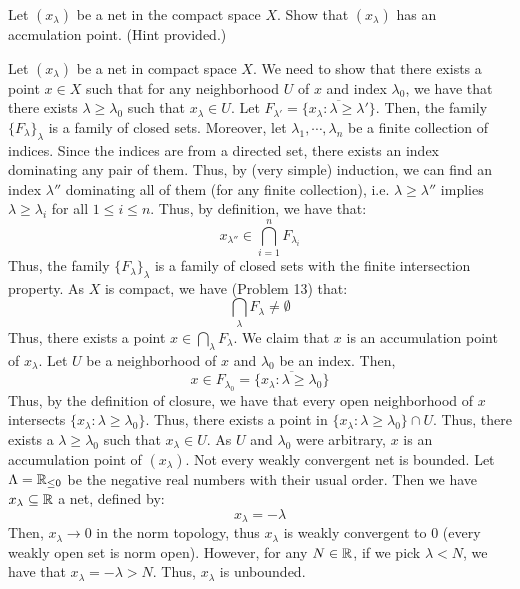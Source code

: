 \documentclass[12pt]{article}
\begin{document}
\begin{problem}{51}
    Let $(x_\lambda)$ be a net in the compact space $X$. Show that $(x_\lambda)$ has an accmulation point. (Hint provided.)
\end{problem}
\begin{solution}
    Let $(x_\lambda)$ be a net in compact space $X$. We need to show that there exists a point $x \in X$ such that for any neighborhood $U$ of $x$ and index $\lambda_0$, we have that there exists $\lambda \geq \lambda_0$ such that $x_{\lambda} \in U$. \bbni
    Let $F_{\lambda'} = \overline{\{x_\lambda: \lambda \geq \lambda'\}}$. Then, the family $\{F_\lambda\}_\lambda$ is a family of closed sets. Moreover, let $\lambda_1, \cdots, \lambda_n$ be a finite collection of indices. Since the indices are from a directed set, there exists an index dominating any pair of them. Thus, by (very simple) induction, we can find an index $\lambda''$ dominating all of them (for any finite collection), i.e. $\lambda \geq \lambda''$ implies $\lambda \geq \lambda_i$ for all $1 \leq i \leq n$. Thus, by definition, we have that: 
    \[ x_{\lambda''} \in \bigcap_{i=1}^n F_{\lambda_i}\]
    Thus, the family $\{F_\lambda\}_\lambda$ is a family of closed sets with the finite intersection property. As $X$ is compact, we have (Problem 13) that: 
    \[ \bigcap_{\lambda} F_\lambda \neq \emptyset\]
    Thus, there exists a point $x \in \bigcap_{\lambda} F_\lambda$. We claim that $x$ is an accumulation point of $x_\lambda$. \bbni
    Let $U$ be a neighborhood of $x$ and $\lambda_0$ be an index. Then,
    \[ x \in F_{\lambda_0} = \overline{\{x_\lambda: \lambda \geq \lambda_0 \}}\]
    Thus, by the definition of closure, we have that every open neighborhood of $x$ intersects $\{x_\lambda: \lambda \geq \lambda_0\}$. Thus, there exists a point in $\{x_\lambda: \lambda \geq \lambda_0\} \cap U$. Thus, there exists a $\lambda \geq \lambda_0$ such that $x_\lambda \in U$. \bbni 
    As $U$ and $\lambda_0$ were arbitrary, $x$ is an accumulation point of $(x_\lambda)$. \bbni
    Not every weakly convergent net is bounded. Let $\Lambda = \mathbb R_{\leq 0}$ be the negative real numbers with their usual order. Then we have $x_\lambda \subseteq \mathbb R$ a net, defined by: 
    \[ x_\lambda = -\lambda\]
    Then, $x_\lambda \to 0$ in the norm topology, thus $x_\lambda$ is weakly convergent to $0$ (every weakly open set is norm open). However, for any $N \in \mathbb R$, if we pick $\lambda < N$, we have that $x_\lambda = -\lambda > N$. Thus, $x_\lambda$ is unbounded. 
\end{solution}
\newpage
\end{document}
